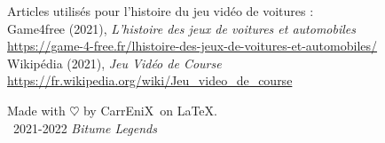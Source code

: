\documentclass[12pt,a4paper]{article}
\newcommand{\btmlgs}{\textit{Bitume Legends}}
\newcommand{\CEX}{CarrEniX}
\begin{document}
\begin{thebibliography}{9}
  Articles utilisés pour l'histoire du jeu vidéo de voitures :\\

  Game4free (2021), \emph{L'histoire des jeux de voitures et automobiles}\\
  \url{https://game-4-free.fr/lhistoire-des-jeux-de-voitures-et-automobiles/}\\

  Wikipédia (2021), \emph{Jeu Vidéo de Course} \\
  \url{https://fr.wikipedia.org/wiki/Jeu_video_de_course}\\

\end{thebibliography}

\begin{center}
  Made with $\heartsuit$ by \CEX\, on \LaTeX.\\
\textcopyright\, 2021-2022 \btmlgs
\end{center}
\end{document}
